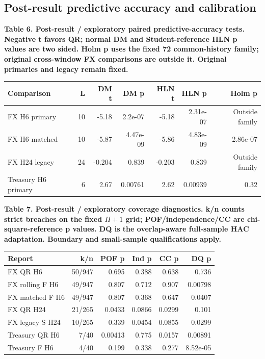 \documentclass[10pt,a4paper]{article}
\begin{document}
\subsection*{Post-result predictive accuracy and calibration}
\begin{center}
\begin{minipage}{\linewidth}
\small\textbf{Table 6. Post-result / exploratory paired predictive-accuracy tests. Negative t favors QR; normal DM and Student-reference HLN p values are two sided. Holm p uses the fixed 72 common-history family; original cross-window FX comparisons are outside it. Original primaries and legacy remain fixed.}\par\medskip
\centering\fontsize{8}{10}\selectfont
\begin{tabular}{lrrrrrr}
\toprule
Comparison & L & DM t & DM p & HLN t & HLN p & Holm p \\
\midrule
FX H6 primary & 10 & -5.18 & 2.2e-07 & -5.18 & 2.31e-07 & Outside family \\
FX H6 matched & 10 & -5.87 & 4.47e-09 & -5.86 & 4.83e-09 & 2.86e-07 \\
FX H24 legacy & 24 & -0.204 & 0.839 & -0.203 & 0.839 & Outside family \\
Treasury H6 primary & 6 & 2.67 & 0.00761 & 2.62 & 0.00939 & 0.32 \\
\bottomrule
\end{tabular}
\end{minipage}
\end{center}
\begin{center}
\begin{minipage}{\linewidth}
\small\textbf{Table 7. Post-result / exploratory coverage diagnostics. k/n counts strict breaches on the fixed \(H+1\) grid; POF/independence/CC are chi-square-reference p values. DQ is the overlap-aware full-sample HAC adaptation. Boundary and small-sample qualifications apply.}\par\medskip
\centering\fontsize{8}{10}\selectfont
\begin{tabular}{lrrrrr}
\toprule
Report & k/n & POF p & Ind p & CC p & DQ p \\
\midrule
FX QR H6 & 50/947 & 0.695 & 0.388 & 0.638 & 0.736 \\
FX rolling F H6 & 49/947 & 0.807 & 0.712 & 0.907 & 0.00798 \\
FX matched F H6 & 49/947 & 0.807 & 0.368 & 0.647 & 0.0407 \\
FX QR H24 & 21/265 & 0.0433 & 0.0866 & 0.0299 & 0.101 \\
FX legacy S H24 & 10/265 & 0.339 & 0.0454 & 0.0855 & 0.0299 \\
Treasury QR H6 & 7/40 & 0.00413 & 0.775 & 0.0157 & 0.00891 \\
Treasury F H6 & 4/40 & 0.199 & 0.338 & 0.277 & 8.52e-05 \\
\bottomrule
\end{tabular}
\end{minipage}
\end{center}
\end{document}
